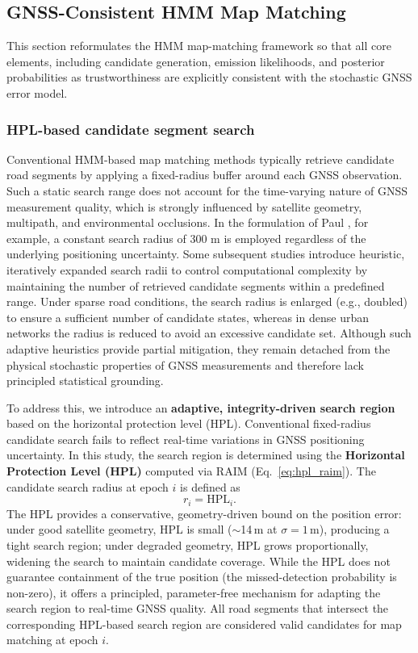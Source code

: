 \documentclass[letterpaper,journal]{IEEEtran}
\begin{document}
\subsection{GNSS-Consistent HMM Map Matching}
\label{subsec:gnss_consistent_hmm}

This section reformulates the HMM map-matching framework so that all core
elements, including candidate generation, emission
likelihoods, and posterior probabilities as trustworthiness are explicitly consistent with the stochastic GNSS error model.

\subsubsection{HPL-based candidate segment search}
Conventional HMM-based map matching methods typically retrieve candidate road segments by applying a fixed-radius buffer around each GNSS observation. Such a static search range does not account for the time-varying nature of GNSS measurement quality, which is strongly influenced by satellite geometry, multipath, and environmental occlusions. In the formulation of Paul \cite{HMM}, for example, a constant search radius of 300 m is employed regardless of the underlying positioning uncertainty. Some subsequent studies introduce heuristic, iteratively expanded search radii to control computational complexity by maintaining the number of retrieved candidate segments within a predefined range. Under sparse road conditions, the search radius is enlarged (e.g., doubled) to ensure a sufficient number of candidate states, whereas in dense urban networks the radius is reduced to avoid an excessive candidate set. Although such adaptive heuristics provide partial mitigation, they remain detached from the physical stochastic properties of GNSS measurements and therefore lack principled statistical grounding.

To address this, we introduce an \textbf{adaptive, integrity-driven search region} based on the horizontal protection level (HPL). Conventional fixed-radius candidate search fails to reflect real-time variations in GNSS positioning uncertainty. In this study, the search region is determined using the \textbf{Horizontal Protection Level (HPL)} computed via RAIM (Eq.~\eqref{eq:hpl_raim}). The candidate search radius at epoch $i$ is defined as
\begin{equation}
r_i = \mathrm{HPL}_i .
\end{equation}
The HPL provides a conservative, geometry-driven bound on the position error: under good satellite geometry, HPL is small ($\sim$14\,m at $\sigma=1$\,m), producing a tight search region; under degraded geometry, HPL grows proportionally, widening the search to maintain candidate coverage. While the HPL does not guarantee containment of the true position (the missed-detection probability is non-zero), it offers a principled, parameter-free mechanism for adapting the search region to real-time GNSS quality. All road segments
that intersect the corresponding HPL-based search region are considered valid
candidates for map matching at epoch $i$.
\end{document}
